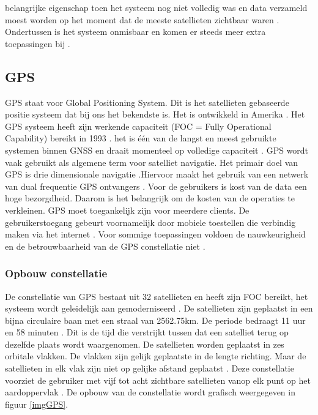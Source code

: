 belangrijke eigenschap toen het systeem nog niet volledig was en data verzameld moest worden op het moment dat de meeste satellieten zichtbaar waren \cite{LBibGNSS7}. Ondertussen is het systeem onmisbaar en komen er steeds meer extra toepassingen bij \cite{LBibGNSS8}.

\subsection{GPS}
\label{LGPS} 
GPS staat voor Global Positioning System. Dit is het satellieten gebaseerde positie systeem dat bij ons het bekendste is. Het is ontwikkeld in Amerika \cite{LBibGNSS, LBibGNSS3}. Het GPS systeem heeft zijn werkende capaciteit (FOC = Fully Operational Capability) bereikt in 1993 \cite{LBibGPS4}. het is \'e\'en van de langst en meest gebruikte systemen binnen GNSS en draait momenteel op volledige capaciteit \cite{LBibGNSS4,LBibGNSS8}. GPS wordt vaak gebruikt als algemene term voor satelliet navigatie. Het primair doel van GPS is drie dimensionale navigatie \cite{LBibGNSS8}.Hiervoor maakt het gebruik van een netwerk van dual frequentie GPS ontvangers \cite{LBibGPS5}. Voor de gebruikers is kost van de data een hoge bezorgdheid. Daarom is het belangrijk om de kosten van de operaties te verkleinen. GPS moet toegankelijk zijn voor meerdere clients. De gebruikerstoegang gebeurt voornamelijk door mobiele toestellen die verbindig maken via het internet \cite{LBibGPS}. Voor sommige toepassingen voldoen de nauwkeurigheid en de betrouwbaarheid van de GPS constellatie niet \cite{LBibGNSS6}.

\subsubsection{Opbouw constellatie}
 De constellatie van GPS bestaat uit 32 satellieten en heeft zijn FOC bereikt, het systeem wordt geleidelijk aan gemoderniseerd \cite{LBibGNSS4}. De satellieten zijn geplaatst in een bijna circulaire baan met een straal van 2562.75km. De periode bedraagt 11 uur en 58 minuten \cite{LBibGNSS6,LBibGNSS8}. Dit is de tijd die verstrijkt tussen dat een satelliet terug op dezelfde plaats wordt waargenomen. De satellieten worden geplaatst in zes orbitale vlakken. De vlakken zijn gelijk geplaatste in de lengte richting. Maar de satellieten in elk vlak zijn niet op gelijke afstand geplaatst \cite{LBibGNSS6}. Deze constellatie voorziet de gebruiker met vijf tot acht zichtbare satellieten vanop elk punt op het aardoppervlak \cite{LBibGNSS8}. De opbouw van de constellatie wordt grafisch weergegeven in figuur \ref{imgGPS}.
 
